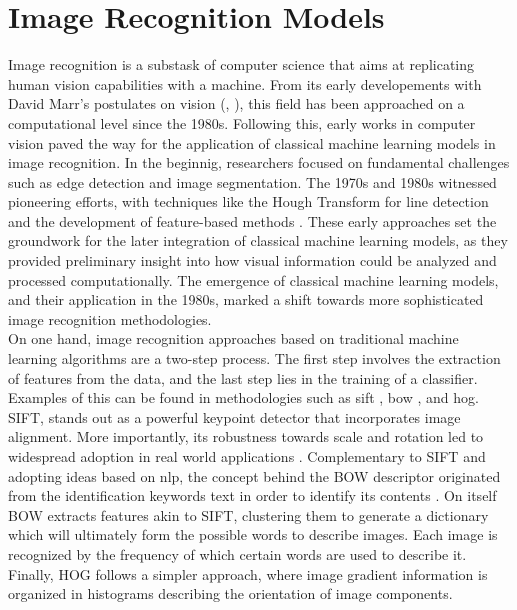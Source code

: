\section{Image Recognition Models}
\label{rel:sec_imrecon}
Image recognition is a substask of computer science that aims at replicating human vision 
capabilities with a machine. From its early developements  with David Marr's postulates 
on vision (\cite{poggio1981marr}, \cite{marr2010vision}), this field has been approached on a 
computational level since the 1980s. Following this, early works in computer vision 
paved the way for the application of classical machine learning models in image recognition. In 
the beginnig, researchers focused on fundamental challenges such as edge detection and image 
segmentation. The 1970s and 1980s witnessed pioneering efforts, with 
techniques like the Hough Transform for line detection and the development of feature-based 
methods \autocite{duda1972use}. These early approaches set the groundwork for the later integration 
of classical machine learning models, as they provided preliminary insight into how visual 
information could be analyzed and processed computationally. The emergence of classical machine 
learning models, and their application in the 1980s, marked a shift towards more sophisticated 
image recognition methodologies.\\

\noindent On one hand, image recognition approaches based on traditional machine learning 
algorithms are a two-step process. The first step involves the extraction of features from the 
data, and the last step lies in the training of a classifier. Examples of this 
can be found in methodologies such as \gls{sift} \autocite{lowe1999object}, \gls{bow} 
\autocite{csurka2004visual}, and \gls{hog}. 
SIFT, stands out as a powerful keypoint detector that incorporates image alignment. 
More importantly, its robustness towards scale and rotation led to widespread adoption in real 
world applications \autocite{cruz2012scale}.
Complementary to SIFT and adopting ideas based on \gls{nlp}, the concept behind the BOW descriptor 
originated from the identification keywords text in order to identify its contents 
\autocite{harris1954distributional}. On itself BOW extracts features akin to SIFT, clustering them 
to generate a dictionary which will ultimately form the possible words to describe images. Each 
image is recognized by the frequency of which certain words are used to describe it.
Finally, HOG follows a simpler approach, where image gradient information is organized in histograms 
describing the orientation of image components. \\ 

